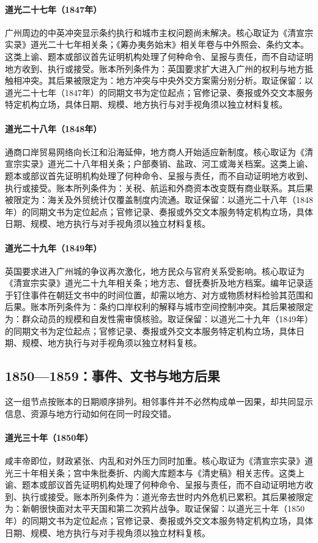 \hypertarget{ledger:EQ-1847-GUANGZHOU-CONFLICT}{}\paragraph{道光二十七年（1847年）}广州周边的中英冲突显示条约执行和城市主权问题尚未解决。核心取证为《清宣宗实录》道光二十七年相关条；《筹办夷务始末》相关年卷与中外照会、条约文本。这类上谕、题本或部议首先证明机构处理了何种命令、呈报与责任，而不自动证明地方收到、执行或接受。账本所列条件为：英国要求扩大进入广州的权利与地方抵触相冲突。其后果被限定为：地方冲突与中央外交方案需分别分析。取证保留：以道光二十七年（1847年）的同期文书为定位起点；官修记录、奏报或外交文本服务特定机构立场，具体日期、规模、地方执行与对手视角须以独立材料复核。
\hypertarget{ledger:EQ-1848-YANGTZE-TRADE}{}\paragraph{道光二十八年（1848年）}通商口岸贸易网络向长江和沿海延伸，地方商人开始适应新制度。核心取证为《清宣宗实录》道光二十八年相关条；户部奏销、盐政、河工或海关档案。这类上谕、题本或部议首先证明机构处理了何种命令、呈报与责任，而不自动证明地方收到、执行或接受。账本所列条件为：关税、航运和外商资本改变既有商业联系。其后果被限定为：海关及外贸统计仅覆盖制度内流通。取证保留：以道光二十八年（1848年）的同期文书为定位起点；官修记录、奏报或外交文本服务特定机构立场，具体日期、规模、地方执行与对手视角须以独立材料复核。
\hypertarget{ledger:EQ-1849-GUANGZHOU-CITY-ENTRY}{}\paragraph{道光二十九年（1849年）}英国要求进入广州城的争议再次激化，地方民众与官府关系受影响。核心取证为《清宣宗实录》道光二十九年相关条；地方志、督抚奏折及地方档案。编年记录适于钉住事件在朝廷文书中的时间位置，却需以地方、对方或物质材料检验其范围和后果。账本所列条件为：条约口岸权利的解释与城市空间控制冲突。其后果被限定为：群众动员的规模和自发性需审慎核验。取证保留：以道光二十九年（1849年）的同期文书为定位起点；官修记录、奏报或外交文本服务特定机构立场，具体日期、规模、地方执行与对手视角须以独立材料复核。
\subsection{1850—1859：事件、文书与地方后果}
这一组节点按账本的日期顺序排列。相邻事件并不必然构成单一因果，却共同显示信息、资源与地方行动如何在同一时段交错。
\hypertarget{ledger:EQ-1850-XIANFENG-ACCESSION}{}\paragraph{道光三十年（1850年）}咸丰帝即位，财政紧张、内乱和对外压力同时加重。核心取证为《清宣宗实录》道光三十年相关条；宫中朱批奏折、内阁大库题本与《清史稿》相关志传。这类上谕、题本或部议首先证明机构处理了何种命令、呈报与责任，而不自动证明地方收到、执行或接受。账本所列条件为：道光帝去世时内外危机已累积。其后果被限定为：新朝很快面对太平天国和第二次鸦片战争。取证保留：以道光三十年（1850年）的同期文书为定位起点；官修记录、奏报或外交文本服务特定机构立场，具体日期、规模、地方执行与对手视角须以独立材料复核。

